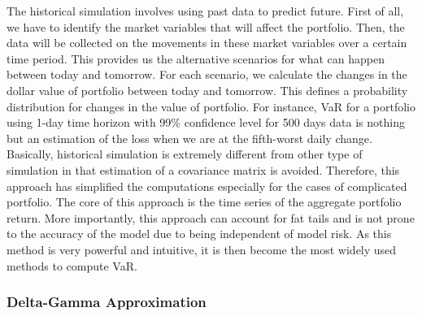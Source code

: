 \documentclass[a4paper,11pt,oneside]{book}
\begin{document}
The historical simulation involves using past data to predict future. First of all, we
have to identify the market variables that will affect the portfolio. Then, the data
will be collected on the movements in these market variables over a certain time
period. This provides us the alternative scenarios for what can happen between
today and tomorrow. For each scenario, we calculate the changes in the dollar
value of portfolio between today and tomorrow. This defines a probability
distribution for changes in the value of portfolio. For instance, VaR for a portfolio
using 1-day time horizon with 99\% confidence level for 500 days data is nothing
but an estimation of the loss when we are at the fifth-worst daily change.
\newline\newline Basically, historical simulation is extremely different from other type of
simulation in that estimation of a covariance matrix is avoided. Therefore, this approach has simplified the computations especially for the cases of complicated
portfolio.\newline\newline
The core of this approach is the time series of the aggregate portfolio return. More
importantly, this approach can account for fat tails and is not prone to the
accuracy of the model due to being independent of model risk. As this method is
very powerful and intuitive, it is then become the most widely used methods to
compute VaR.

\subsubsection{Delta-Gamma Approximation
}
\end{document}
